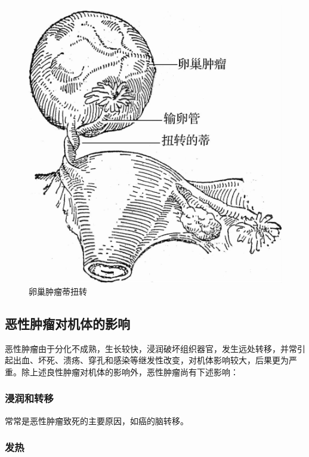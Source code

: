 \begin{figure}[!htbp]
  \centering
  \includegraphics[scale=1.2]{./images/Image00078.jpg}
  \caption{卵巢肿瘤蒂扭转}
  \label{fig5-11}
\end{figure}

\subsection{恶性肿瘤对机体的影响}

恶性肿瘤由于分化不成熟，生长较快，浸润破坏组织器官，发生远处转移，并常引起出血、坏死、溃疡、穿孔和感染等继发性改变，对机体影响较大，后果更为严重。除上述良性肿瘤对机体的影响外，恶性肿瘤尚有下述影响：

\subsubsection{浸润和转移}

常常是恶性肿瘤致死的主要原因，如癌的脑转移。

\subsubsection{发热}

